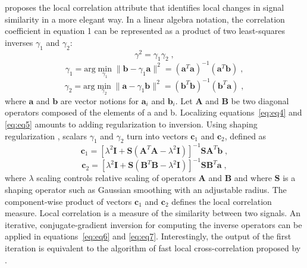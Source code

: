 \cite{Fomel07b} proposes the local correlation attribute that identifies
local changes in signal similarity in a more elegant way. In a linear
algebra notation, the correlation coefficient in equation 1 can be
represented as a product of two least-squares inverses $\gamma_1$ and $\gamma_2$:
      \begin{equation}
          \gamma^2 = \gamma_1 \gamma_2\;,
        \label{eq:eq3}
      \end{equation}
      \begin{equation}
          \gamma_1 = \textrm{arg} \min_{\gamma_1}\parallel \mathbf{b}-\gamma_1 \mathbf{a} \parallel^2 = (\mathbf{a}^T\mathbf{a})^{-1}(\mathbf{a}^T\mathbf{b})\;,
        \label{eq:eq4}
      \end{equation}
      \begin{equation}
        \label{eq:eq5}
          \gamma_2 = \textrm{arg} \min_{\gamma_2}\parallel \mathbf{a}-\gamma_1 \mathbf{b} \parallel^2 = (\mathbf{b}^T\mathbf{b})^{-1}(\mathbf{b}^T\mathbf{a})\;,
      \end{equation}
where $\mathbf{a}$ and $\mathbf{b}$ are vector notions for $\mathbf{a}_i$ and 
$\mathbf{b}_i$. Let $\mathbf{A}$ and $\mathbf{B}$ be two diagonal
operators composed of the elements of a and b. Localizing
equations~\ref{eq:eq4} and \ref{eq:eq5} amounts to adding regularization to 
inversion. Using shaping regularization \cite[]{Fomel07a}, scalars $\gamma_1$ 
and $\gamma_2$ turn into vectors $\mathbf{c}_1$ and $\mathbf{c}_2$, defined as
      \begin{equation}
          \mathbf{c}_1 = [\lambda^2 \mathbf{I} + \mathbf{S}(\mathbf{A}^T \mathbf{A} - \lambda^2 \mathbf{I})]^{-1}\mathbf{S}\mathbf{A}^T\mathbf{b}\;,
        \label{eq:eq6}
      \end{equation}
      \begin{equation}
          \mathbf{c}_2 = [\lambda^2 \mathbf{I} + \mathbf{S}(\mathbf{B}^T \mathbf{B} - \lambda^2 \mathbf{I})]^{-1}\mathbf{S}\mathbf{B}^T\mathbf{a}\;,
        \label{eq:eq7}
      \end{equation}
where $\lambda$ scaling controls relative scaling of operators $\mathbf{A}$ 
and $\mathbf{B}$ and
where $\mathbf{S}$ is a shaping operator such as Gaussian smoothing with an
adjustable radius. The component-wise product of vectors $\mathbf{c}_1$ and 
$\mathbf{c}_2$
defines the local correlation measure. Local correlation is a measure
of the similarity between two signals.
An iterative, conjugate-gradient inversion for computing the inverse
operators can be applied in equations~\ref{eq:eq6} and \ref{eq:eq7}. 
Interestingly, the output of the first iteration is equivalent to the 
algorithm of fast local
cross-correlation proposed by \cite{Hale06}.

